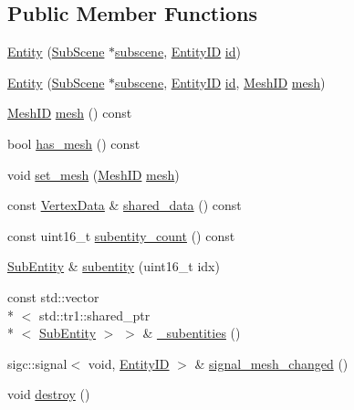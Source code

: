 \subsection*{Public Member Functions}
\begin{DoxyCompactItemize}
\item 
\hyperlink{classkglt_1_1_entity_a02242961f097dba8bec98330e5dcf270}{Entity} (\hyperlink{classkglt_1_1_sub_scene}{Sub\-Scene} $\ast$\hyperlink{classkglt_1_1_object_a857d97844a3a56aeb8f0a180b7cf592f}{subscene}, \hyperlink{namespacekglt_a693458ae13c224ae3ea4074ac3a0b02a}{Entity\-I\-D} \hyperlink{classkglt_1_1generic_1_1_identifiable_a7930d0f7da424ad524d888726fcc12bd}{id})
\item 
\hyperlink{classkglt_1_1_entity_aa887d3745d006deea905c7128e44ed2a}{Entity} (\hyperlink{classkglt_1_1_sub_scene}{Sub\-Scene} $\ast$\hyperlink{classkglt_1_1_object_a857d97844a3a56aeb8f0a180b7cf592f}{subscene}, \hyperlink{namespacekglt_a693458ae13c224ae3ea4074ac3a0b02a}{Entity\-I\-D} \hyperlink{classkglt_1_1generic_1_1_identifiable_a7930d0f7da424ad524d888726fcc12bd}{id}, \hyperlink{namespacekglt_a525b047f668a129a0b102be7f2fe32be}{Mesh\-I\-D} \hyperlink{classkglt_1_1_entity_a3d2bbb85d43a0eae28fe69baf8bc8e3b}{mesh})
\item 
\hyperlink{namespacekglt_a525b047f668a129a0b102be7f2fe32be}{Mesh\-I\-D} \hyperlink{classkglt_1_1_entity_a3d2bbb85d43a0eae28fe69baf8bc8e3b}{mesh} () const 
\item 
bool \hyperlink{classkglt_1_1_entity_ade0f7ba4e232ce03b0792209531aff7b}{has\-\_\-mesh} () const 
\item 
void \hyperlink{classkglt_1_1_entity_a0c1a298495604e466d2f3b0eaad54ae9}{set\-\_\-mesh} (\hyperlink{namespacekglt_a525b047f668a129a0b102be7f2fe32be}{Mesh\-I\-D} \hyperlink{classkglt_1_1_entity_a3d2bbb85d43a0eae28fe69baf8bc8e3b}{mesh})
\item 
const \hyperlink{classkglt_1_1_vertex_data}{Vertex\-Data} \& \hyperlink{classkglt_1_1_entity_ac1f64ccd0842d02e4b3871a075251d2c}{shared\-\_\-data} () const 
\item 
const uint16\-\_\-t \hyperlink{classkglt_1_1_entity_a66f388276aab2cf0efbe114be1607508}{subentity\-\_\-count} () const 
\item 
\hyperlink{classkglt_1_1_sub_entity}{Sub\-Entity} \& \hyperlink{classkglt_1_1_entity_a13ca270f77322f527f009d526625bcbd}{subentity} (uint16\-\_\-t idx)
\item 
const std\-::vector\\*
$<$ std\-::tr1\-::shared\-\_\-ptr\\*
$<$ \hyperlink{classkglt_1_1_sub_entity}{Sub\-Entity} $>$ $>$ \& \hyperlink{classkglt_1_1_entity_ad95a38b4911bb0be120f0f5b4077f159}{\-\_\-subentities} ()
\item 
sigc\-::signal$<$ void, \hyperlink{namespacekglt_a693458ae13c224ae3ea4074ac3a0b02a}{Entity\-I\-D} $>$ \& \hyperlink{classkglt_1_1_entity_aca9c31e0476f9c7012eb5f9256fb051a}{signal\-\_\-mesh\-\_\-changed} ()
\item 
void \hyperlink{classkglt_1_1_entity_ae3ec6b3c9bc5847903f75f596aff8712}{destroy} ()
\end{DoxyCompactItemize}
